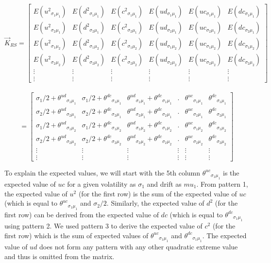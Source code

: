 \documentclass[12pt]{article}   	%
\begin{document}
\begin{enumerate}
$$\vec{K}_{RS}=
\begin{bmatrix}
E({u^2}_{\sigma_1 \mu_1})&E({d^2}_{\sigma_1 \mu_1})&E({c^2}_{\sigma_1 \mu_1})&E({ud}_{\sigma_1 \mu_1})&E({uc}_{\sigma_1 \mu_1})&E({dc}_{\sigma_1 \mu_1})\\
E({u^2}_{\sigma_2 \mu_1})&E({d^2}_{\sigma_2 \mu_1})&E({c^2}_{\sigma_2 \mu_1})&E({ud}_{\sigma_2 \mu_1})&E({uc}_{\sigma_2 \mu_1})&E({dc}_{\sigma_2 \mu_1})\\
E({u^2}_{\sigma_1 \mu_2})&E({d^2}_{\sigma_1 \mu_2})&E({c^2}_{\sigma_1 \mu_2})&E({ud}_{\sigma_1 \mu_2})&E({uc}_{\sigma_1 \mu_2})&E({dc}_{\sigma_1 \mu_2})\\
E({u^2}_{\sigma_2 \mu_2})&E({d^2}_{\sigma_2 \mu_2})&E({c^2}_{\sigma_2 \mu_2})&E({ud}_{\sigma_2 \mu_2})&E({uc}_{\sigma_2 \mu_2})&E({dc}_{\sigma_2 \mu_2})\\
\vdots&\vdots&\vdots&\vdots&\vdots&\vdots\\
\vdots&\vdots&\vdots&\vdots&\vdots&\vdots
\end{bmatrix}$$\\
$$=\begin{bmatrix}
\sigma_1/2 + {\theta^{ud}}_{\sigma_1 \mu_1}&\sigma_1/2 + {\theta^{dc}}_{\sigma_1 \mu_1}&
{\theta^{ud}}_{\sigma_1 \mu_1}+{\theta^{dc}}_{\sigma_1 \mu_1}&.&{\theta^{uc}}_{\sigma_1 \mu_1}&{\theta^{dc}}_{\sigma_1 \mu_1}\\
\sigma_2/2 + {\theta^{ud}}_{\sigma_2 \mu_1}&\sigma_2/2 + {\theta^{dc}}_{\sigma_2 \mu_1}&
{\theta^{ud}}_{\sigma_2 \mu_1}+{\theta^{dc}}_{\sigma_2 \mu_1}&.&{\theta^{uc}}_{\sigma_2 \mu_1}&{\theta^{dc}}_{\sigma_2 \mu_1}\\
\sigma_1/2 + {\theta^{ud}}_{\sigma_1 \mu_2}&\sigma_1/2 + {\theta^{dc}}_{\sigma_1 \mu_2}&
{\theta^{ud}}_{\sigma_1 \mu_2}+{\theta^{dc}}_{\sigma_1 \mu_2}&.&{\theta^{uc}}_{\sigma_1 \mu_2}&{\theta^{dc}}_{\sigma_1 \mu_2}\\
\sigma_2/2 + {\theta^{ud}}_{\sigma_2 \mu_2}&\sigma_2/2 + {\theta^{dc}}_{\sigma_2 \mu_2}&
{\theta^{ud}}_{\sigma_2 \mu_2}+{\theta^{dc}}_{\sigma_2 \mu_2}&.&{\theta^{uc}}_{\sigma_2 \mu_2}&{\theta^{dc}}_{\sigma_2 \mu_2}\\
\vdots&\vdots&\vdots&\vdots&\vdots&\vdots\\
\vdots&\vdots&\vdots&\vdots&\vdots&\vdots
\end{bmatrix}$$

To explain the expected values, we will start with the 5th column ${\theta^{uc}}_{\sigma_1 \mu_1}$ is the expected value of $uc$ for a given volatility as $\sigma_1$ and drift as $mu_1$. From pattern 1, the expected value of $u^2$ (for the first row) is the sum of the expected value of $uc$ (which is equal to ${\theta^{uc}}_{\sigma_1 \mu_1}$ and $\sigma_2/2$. Similarly, the expected value of $d^2$ (for the first row) can be derived from the expected value of $dc$ (which is equal to ${\theta^{dc}}_{\sigma_1 \mu_1}$ using pattern 2. We used pattern 3 to derive the expected value of $c^2$ (for the first row) which is the sum of expected values of ${\theta^{uc}}_{\sigma_1 \mu_1}$ and ${\theta^{dc}}_{\sigma_1 \mu_1}$. The expected value of $ud$ does not form any pattern with any other quadratic extreme value and thus is omitted from the matrix.


\end{enumerate}
\end{document}
